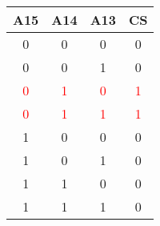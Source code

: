 



\begin{table}[H]
\centering
\begin{tabular}{cccc}
\hline
\textbf{A15} & \textbf{A14} & \textbf{A13} & \textbf{CS} \\
\hline
0            & 0            & 0            & 0           \\
0            & 0            & 1            & 0           \\
\textcolor{red}{0}           & \textcolor{red}{1}            & \textcolor{red}{0}            & \textcolor{red}{1}           \\
\textcolor{red}{0}            & \textcolor{red}{1}            & \textcolor{red}{1}            & \textcolor{red}{1}           \\
1            & 0            & 0            & 0           \\
1            & 0            & 1            & 0           \\
1            & 1            & 0            & 0           \\
1            & 1            & 1            & 0          \\
\hline
\end{tabular}
\end{table}


